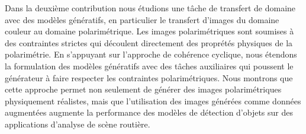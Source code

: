 {Dans la deuxième contribution nous étudions une tâche de transfert de domaine avec des modèles génératifs, en particulier le transfert d'images du domaine couleur au domaine polarimétrique. Les images polarimétriques sont soumises à des contraintes strictes qui découlent directement des proprétés physiques de la polarimétrie. En s'appuyant sur l'approche de cohérence cyclique, nous étendons la formulation des modèles génératifs avec des tâches auxiliaires qui poussent le générateur à faire respecter les contraintes polarimétriques. Nous montrons que cette approche permet non seulement de générer des images polarimétriques physiquement réalistes, mais que l'utilisation des images générées comme données augmentées augmente la performance des modèles de détection d'objets sur des applications d'analyse de scène routière.
}
